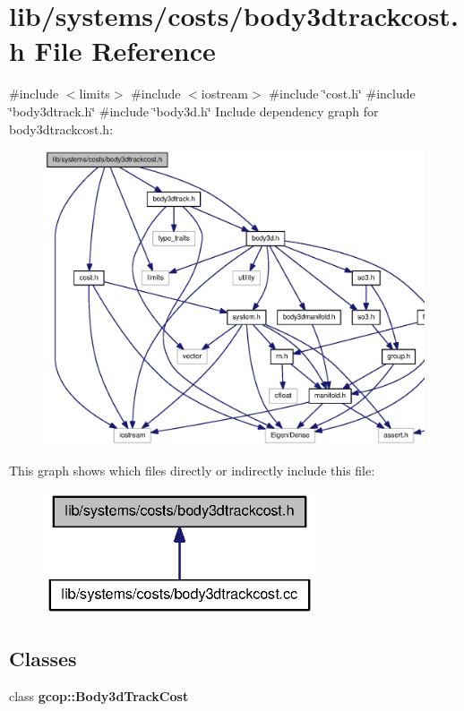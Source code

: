 \section{lib/systems/costs/body3dtrackcost.h \-File \-Reference}
\label{body3dtrackcost_8h}
{\ttfamily \#include $<$limits$>$}\*
{\ttfamily \#include $<$iostream$>$}\*
{\ttfamily \#include \char`\"{}cost.\-h\char`\"{}}\*
{\ttfamily \#include \char`\"{}body3dtrack.\-h\char`\"{}}\*
{\ttfamily \#include \char`\"{}body3d.\-h\char`\"{}}\*
\-Include dependency graph for body3dtrackcost.\-h\-:\nopagebreak
\begin{figure}[H]
\begin{center}
\leavevmode
\includegraphics[width=350pt]{body3dtrackcost_8h__incl}
\end{center}
\end{figure}
\-This graph shows which files directly or indirectly include this file\-:\nopagebreak
\begin{figure}[H]
\begin{center}
\leavevmode
\includegraphics[width=226pt]{body3dtrackcost_8h__dep__incl}
\end{center}
\end{figure}
\subsection*{\-Classes}
\begin{DoxyCompactItemize}
\item 
class {\bf gcop\-::\-Body3d\-Track\-Cost}
\end{DoxyCompactItemize}
